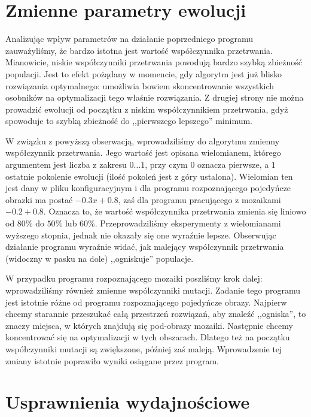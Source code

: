 \documentclass[a4paper,12pt,leqno]{article}
\begin{document}
\section{Zmienne parametry ewolucji}

Analizując wpływ parametrów na działanie poprzedniego programu zauważyliśmy, że bardzo istotna jest wartość współczynnika przetrwania. Mianowicie, niskie współczynniki przetrwania
powodują bardzo szybką zbieżność populacji. Jest to efekt pożądany w momencie, gdy algorytm jest już blisko rozwiązania optymalnego: umożliwia bowiem skoncentrowanie wszystkich
osobników na optymalizacji tego właśnie rozwiązania. Z drugiej strony nie można prowadzić ewolucji od początku z niskim współczynnikiem przetrwania, gdyż spowoduje to szybką
zbieżność do ,,pierwszego lepszego'' minimum.

W związku z powyższą obserwacją, wprowadziliśmy do algorytmu zmienny współczynnik przetrwania. Jego wartość jest opisana wielomianem, którego argumentem jest liczba z zakresu
$0 \dots 1$, przy czym $0$ oznacza pierwsze, a $1$ ostatnie pokolenie ewolucji (ilość pokoleń jest z góry ustalona). Wielomian ten jest dany w pliku konfiguracyjnym i dla programu
rozpoznającego pojedyńcze obrazki ma postać $-0.3x + 0.8$, zaś dla programu pracującego z mozaikami $-0.2 + 0.8$. Oznacza to, że wartość współczynnika przetrwania zmienia się
liniowo od $80\%$ do $50\%$ lub $60\%$. Przeprowadziliśmy eksperymenty z wielomianami wyższego stopnia, jednak nie okazały się one wyraźnie lepsze. Obserwując działanie programu
wyraźnie widać, jak malejący współczynnik przetrwania (widoczny w pasku na dole) ,,ogniskuje'' populacje.

W przypadku programu rozpoznającego mozaiki poszliśmy krok dalej: wprowadziliśmy również zmienne wspólczynniki mutacji. Zadanie tego programu jest istotnie różne od programu
rozpoznającego pojedyńcze obrazy. Najpierw chcemy starannie przeszukać całą przestrzeń rozwiązań, aby znaleźć ,,ogniska'', to znaczy miejsca, w których znajdują się pod-obrazy mozaiki.
Następnie chcemy koncentrować się na optymalizacji w tych obszarach. Dlatego też na początku współczynniki mutacji są zwiększone, później zaś maleją. Wprowadzenie tej zmiany istotnie
poprawiło wyniki osiągane przez program.

\section{Usprawnienia wydajnościowe}
\end{document}

